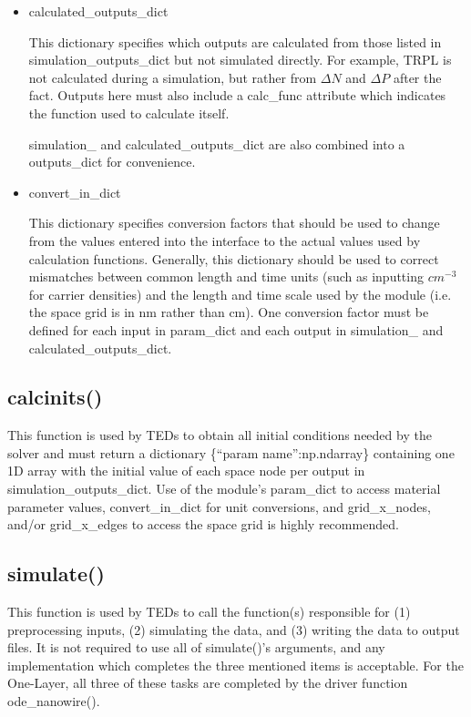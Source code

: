 \documentclass[11pt,letterpaper,titlepage]{article}
\begin{document}
\begin{itemize}
			\item calculated\_outputs\_dict
			\par This dictionary specifies which outputs are calculated from those listed in simulation\_outputs\_dict but not simulated directly. For example, TRPL is not calculated during a simulation, but rather from $\Delta N$ and $\Delta P$ after the fact. Outputs here must also include a calc\_func attribute which indicates the function used to calculate itself.
			
			\par simulation\_ and calculated\_outputs\_dict are also combined into a outputs\_dict for convenience.
			
			\item convert\_in\_dict
			\par This dictionary specifies conversion factors that should be used to change from the values entered into the interface to the actual values used by calculation functions. Generally, this dictionary should be used to correct mismatches between common length and time units (such as inputting $cm^{-3}$ for carrier densities) and the length and time scale used by the module (i.e. the space grid is in nm rather than cm). One conversion factor must be defined for each input in param\_dict and each output in simulation\_ and calculated\_outputs\_dict.
		\end{itemize}
	
		\subsection{calc\textunderscore inits()}
		\par This function is used by TEDs to obtain all initial conditions needed by the solver and must return a dictionary \{“param name”:np.ndarray\} containing one 1D array with the initial value of each space node per output in simulation\_outputs\_dict. Use of the module’s param\_dict to access material parameter values, convert\_in\_dict for unit conversions, and grid\_x\_nodes, and/or grid\_x\_edges to access the space grid is highly recommended.
		
		\subsection{simulate()}
		\par This function is used by TEDs to call the function(s) responsible for (1) preprocessing inputs, (2) simulating the data, and (3) writing the data to output files. It is not required to use all of simulate()’s arguments, and any implementation which completes the three mentioned items is acceptable. For the One-Layer, all three of these tasks are completed by the driver function ode\_nanowire().
		
\end{document}
